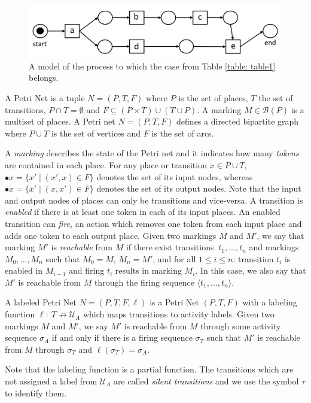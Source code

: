 %
%
%
\begin{figure}[h!]
	\centering
	\includegraphics[width=0.8 \columnwidth]{figures/model1.png}
	\caption{A model of the process to which the case from Table \ref{table: table1} belongs. }
	\label{fig: model1}
\end{figure}
%
%
%
%
\begin{definition}
A Petri Net is a tuple $N=(P,T,F)$ where $P$ is the set of places, $T$ the set of transitions, $P \cap T = \emptyset$ and $F \subseteq (P \times T) \cup (T \cup P)$.
A marking $M \in \mathcal{B}(P)$ is a multiset of places.
A Petri net $N=(P,T,F)$ defines a directed bipartite graph where $P \cup T$ is the set of vertices and $F$ is the set of arcs.
\end{definition}

A \textit{marking} describes the state of the Petri net and it indicates how many \textit{tokens} are contained in each place.
For any place or transition $x \in P \cup T$, $\bullet x=\{x' \mid (x',x) \in F\}$ denotes the set of its input nodes, whereas $\bullet x=\{x' \mid (x,x') \in F\}$ denotes the set of its output nodes.
Note that the input and output nodes of places can only be transitions and vice-versa.
A transition is \textit{enabled} if there is at least one token in each of its input places.
An enabled transition can \textit{fire}, an action which removes one token from each input place and adds one token to each output place.
Given two markings $M$ and $M'$, we say that marking $M'$ is \textit{reachable} from $M$ if there exist transitions $\ t_1,...,t_n $ and markings $M_0,...,M_n$ such that $M_0=M$, $M_n=M'$, and for all $1 \leq i \leq n $: transition $t_i$ is enabled in $M_{i-1}$ and firing $t_i$ results in marking $M_i$.
In this case, we also say that $M'$ is reachable from $M$ through the firing sequence $\langle t_1,...,t_n \rangle$.

\begin{definition}
A labeled Petri Net $N=(P,T,F,\ell)$ is a Petri Net $(P,T,F)$ with a labeling function $\ell: ~ T \not \to \mathcal{U}_A$ which maps transitions to activity labels.
Given two markings $M$ and $M'$, we say $M'$ is reachable from $M$ through some activity sequence $\sigma_A$ if and only if there is a firing sequence $\sigma_T$ such that $M'$ is reachable from $M$ through $\sigma_T$ and $\ell(\sigma_T)=\sigma_A$.
\end{definition}
Note that the labeling function is a partial function.
The transitions which are not assigned a label from $\mathcal{U}_A$ are called \textit{silent transitions} and we use the symbol $\tau$ to identify them.

